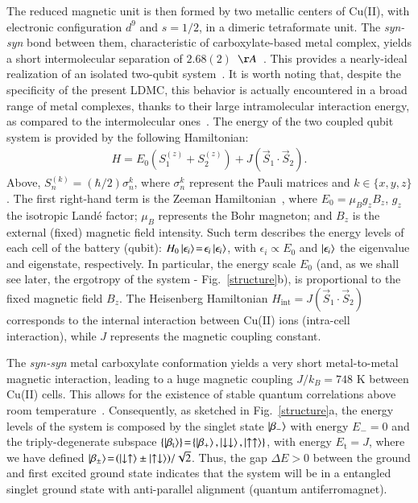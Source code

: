 \documentclass[aps,prl,epsfigure,twocolumn,superscriptaddress]{revtex4-1}
\newcommand{\1}{\mathbbm{1}}
\begin{document}
The reduced magnetic unit is then formed by two metallic centers of Cu(II), with electronic configuration $d^{9}$ and $s=1/2$, in a dimeric  tetraformate unit. The \textit{syn-syn} bond between them, characteristic of carboxylate-based metal complex, yields a short intermolecular separation of $2.68(2)$~$\AA$~\cite{cruz,souza}. This provides a nearly-ideal realization of an isolated two-qubit system~\cite{yurishchev2011quantum,gaita2019molecular,moreno2018molecular}. It is worth noting that, despite the specificity of the present LDMC, this behavior is actually encountered in a broad range of metal complexes, thanks to their large intramolecular interaction energy, as compared to the intermolecular ones~\cite{cruz2020quantifying,yurishchev2011quantum,souza,souza2,kova2020unconventional,chakraborty2019magnetocaloric,yurishchev2011quantum,gaita2019molecular,moreno2018molecular}. The energy of the two coupled qubit system is provided by the following Hamiltonian:
\begin{align}
	H = E_{0} \left(S_{1}^{(z)}   + S_{2} ^{(z)}\right)+J \left( \vec{S}_{1} \cdot \vec{S}_{2} \right).
\end{align}
Above, $S_{n}^{(k)}\!=\!(\hbar/2)\sigma_{n}^{k}$, where $\sigma_{n}^{k}$ represent the Pauli matrices and $k\!\in\!\{x,y,z\}$. The first right-hand term is the Zeeman Hamiltonian~\cite{mario}, where $E_{0}\!=\!\mu_B g_z B_z$, $g_z$ the isotropic Land\'{e} factor; $\mu_B$ represents the Bohr magneton; and $B_z$ is the external (fixed) magnetic field intensity. Such term describes the energy levels of each cell of the battery (qubit): $H_{0}\ket{\epsilon_{i}}\!=\!\epsilon_{i}\ket{\epsilon_{i}}$, with $\epsilon_i\!\propto\!E_{0}$ and $\ket{\epsilon_{i}}$ the eigenvalue and eigenstate, respectively. In particular, the energy scale $E_0$ (and, as we shall see later, the ergotropy of the system - Fig.~\ref{structure}{\color{blue}b}), is proportional to the fixed magnetic field $B_z$. The Heisenberg Hamiltonian $H_{\text{int}}= J \left( \vec{S}_{1} \cdot \vec{S}_{2} \right)$ corresponds to the internal interaction between Cu(II) ions (intra-cell interaction), while $J$ represents the magnetic coupling constant.

The \textit{syn-syn} metal carboxylate conformation yields a very short metal-to-metal magnetic interaction, leading to a huge magnetic coupling $J/k_{B}\!=\!748$ K between Cu(II) cells. This allows for the existence of stable quantum correlations above room temperature~\cite{mario2,souza}. Consequently, as sketched in Fig.~\ref{structure}{\color{blue}a}, the energy levels of the system is composed by the singlet state $\ket{\beta_{-}}$ with energy $E_{-} = 0$ and the triply-degenerate subspace $\{\ket{\beta_{\text{t}}}\}\!=\!\{\ket{\beta_{+}}, \ket{\downarrow\downarrow}, \ket{\uparrow\uparrow}\}$, with energy $E_{\text{t}} = J$, where we have defined $\ket{\beta_{\pm}}\!=\!(\ket{\downarrow\uparrow}\pm\ket{\uparrow\downarrow})/\sqrt{2}$. Thus, the gap $\Delta E > 0$ between the ground and first excited ground state indicates that the system will be in a entangled singlet ground state with anti-parallel alignment (quantum antiferromagnet). 
\end{document}
